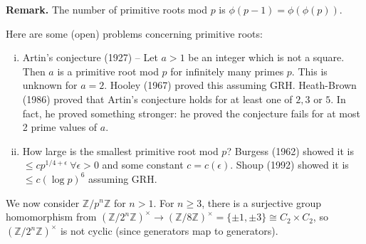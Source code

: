 \documentclass{article}
\theoremstyle{definition}
\theoremstyle{remark}
\begin{document}

\textbf{Remark.} The number of primitive roots mod $p$ is $\phi(p-1)=\phi(\phi(p))$.
\vspace{1mm}

Here are some (open) problems concerning primitive roots:
\begin{enumerate}[(i)]
    \item Artin's conjecture (1927) -- Let $a>1$ be an integer which is not a square. Then $a$ is a primitive root mod $p$ for infinitely many primes $p$. This is unknown for $a=2$. Hooley (1967) proved this assuming GRH. Heath-Brown (1986) proved that Artin's conjecture holds for at least one of $2,3$ or $5$. In fact, he proved something stronger: he proved the conjecture fails for at most 2 prime values of $a$.   
    \item How large is the smallest primitive root mod $p$? Burgess (1962) showed it is $\le c p^{1/4 + \epsilon} ~\forall  \epsilon>0$ and some constant $c=c(\epsilon)$. Shoup (1992) showed it is $\le c(\log p)^6$ assuming GRH.
\end{enumerate}

We now consider $\mathbb{Z}/p^n\mathbb{Z}$ for $n>1$. For $n \ge 3$, there is a surjective group homomorphism from $(\mathbb{Z}/2^n\mathbb{Z})^{\times} \to (\mathbb{Z}/8\mathbb{Z})^{\times} = \{\pm 1, \pm3\} \cong C_2 \times C_2$, so $(\mathbb{Z}/2^{n}\mathbb{Z})^{\times}$ is not cyclic (since generators map to generators).
\end{document}
